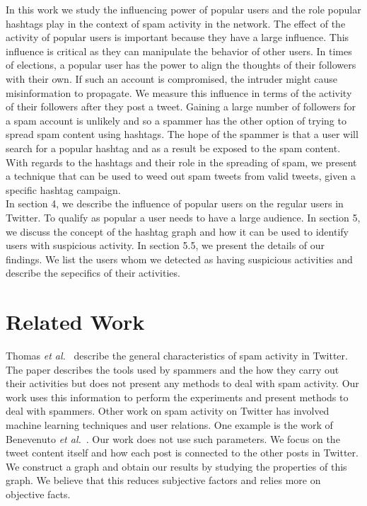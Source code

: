 \documentclass[journal, a4paper, 12pt]{article}
\begin{document}
In this work we study the influencing power of popular users and the role popular hashtags play in the context of spam activity in the network. The effect of the activity of popular users is important because they have a large influence. This influence is critical as they can manipulate the behavior of other users. In times of elections, a popular user has the power to align the thoughts of their followers with their own. If such an account is compromised, the intruder might cause misinformation to propagate. We measure this influence in terms of the activity of their followers after they post a tweet. Gaining a large number of followers for a spam account is unlikely and so a spammer has the other option of trying to spread spam content using hashtags. The hope of the spammer is that a user will search for a popular hashtag and as a result be exposed to the spam content. With regards to the hashtags and their role in the spreading of spam, we present a technique that can be used to weed out spam tweets from valid tweets, given a specific hashtag campaign. \\

In section 4, we describe the influence of popular users on the regular users in Twitter. To qualify as popular a user needs to have a large audience. In section 5, we discuss the concept of the hashtag graph and how it can be used to identify users with suspicious activity. In section 5.5, we present the details of our findings. We list the users whom we detected as having suspicious activities and describe the sepecifics of their activities.


\section{Related Work}

Thomas \textit{et al.}~\cite{thomas_paper} describe the general characteristics of spam activity in Twitter. The paper describes the tools used by spammers and the how they carry out their activities but does not present any methods to deal with spam activity. Our work uses this information to perform the experiments and present methods to deal with spammers. Other work on spam activity on Twitter has involved machine learning techniques and user relations. One example is the work of Benevenuto \textit{et al.}~\cite{benevenuto_paper}. Our work does not use such parameters. We focus on the tweet content itself and how each post is connected to the other posts in Twitter. We construct a graph and obtain our results by studying the properties of this graph. We believe that this reduces subjective factors and relies more on objective facts.  
\end{document}
